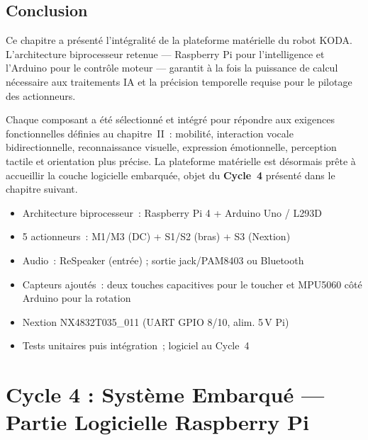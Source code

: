 \documentclass[a4paper,12pt]{report}
\begin{document}
	\section{Conclusion}
	
	Ce chapitre a présenté l'intégralité de la plateforme matérielle du robot
	KODA. L'architecture biprocesseur retenue — Raspberry Pi pour l'intelligence
	et l'Arduino pour le contrôle moteur — garantit à la fois la puissance de
	calcul nécessaire aux traitements IA et la précision temporelle requise
	pour le pilotage des actionneurs.
	
	Chaque composant a été sélectionné et intégré pour répondre aux exigences
	fonctionnelles définies au chapitre~II~: mobilité, interaction vocale
	bidirectionnelle, reconnaissance visuelle, expression émotionnelle, perception
	tactile et orientation plus précise.
	La plateforme matérielle est désormais prête à accueillir la couche logicielle
	embarquée, objet du \textbf{Cycle~4} présenté dans le chapitre suivant.
	
	\begin{tcolorbox}[colback=blue!5!white, colframe=blue!60!black,
		title=\textbf{Points clés du Cycle 3}]
		\begin{itemize}[noitemsep]
			\item Architecture biprocesseur~: Raspberry Pi 4 + Arduino Uno / L293D
			\item 5 actionneurs~: M1/M3 (DC) + S1/S2 (bras) + S3 (Nextion)
			\item Audio~: ReSpeaker (entrée) ; sortie jack/PAM8403 ou Bluetooth
			\item Capteurs ajoutés~: deux touches capacitives pour le toucher et MPU5060 côté Arduino pour la rotation
			\item Nextion NX4832T035\_011 (UART GPIO 8/10, alim. 5\,V Pi)
			\item Tests unitaires puis intégration~; logiciel au Cycle~4
		\end{itemize}
	\end{tcolorbox}

	\chapter{Cycle 4 : Système Embarqué --- Partie Logicielle Raspberry Pi}
	
\end{document}
